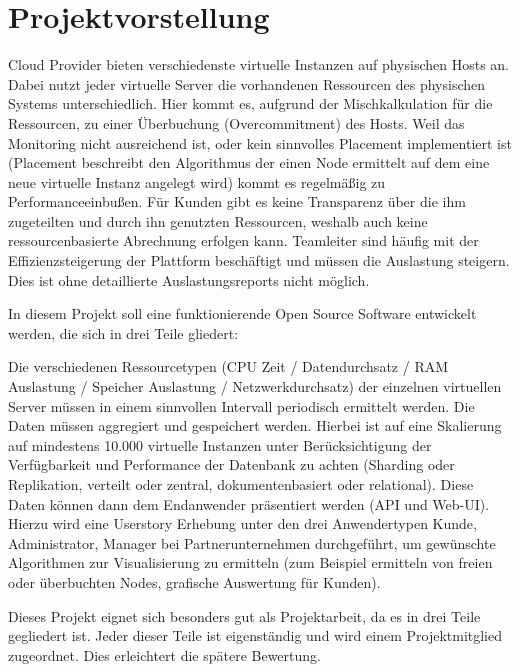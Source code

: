 \section{Projektvorstellung}
\label{subsubsec:projektvorstellung}
Cloud Provider bieten verschiedenste virtuelle Instanzen auf physischen Hosts
an. Dabei nutzt jeder virtuelle Server die vorhandenen Ressourcen des
physischen Systems unterschiedlich. Hier kommt es, aufgrund der
Mischkalkulation für die Ressourcen, zu einer Überbuchung (Overcommitment) des
Hosts. Weil das Monitoring nicht ausreichend ist, oder kein sinnvolles
Placement implementiert ist (Placement beschreibt den Algorithmus der einen
Node ermittelt auf dem eine neue virtuelle Instanz angelegt wird) kommt es
regelmäßig zu Performanceeinbußen. Für Kunden gibt es keine Transparenz über
die ihm zugeteilten und durch ihn genutzten Ressourcen, weshalb auch keine
ressourcenbasierte Abrechnung erfolgen kann. Teamleiter sind häufig mit der
Effizienzsteigerung der Plattform beschäftigt und müssen die Auslastung
steigern. Dies ist ohne detaillierte Auslastungsreports nicht möglich.

In diesem Projekt soll eine funktionierende Open Source Software entwickelt
werden, die sich in drei Teile gliedert:

\begin{outline}
  \1 Die verschiedenen Ressourcetypen (CPU Zeit / Datendurchsatz / RAM
  Auslastung / Speicher Auslastung / Netzwerkdurchsatz) der einzelnen
  virtuellen Server müssen in einem sinnvollen Intervall periodisch ermittelt
  werden.
  \1 Die Daten müssen aggregiert und gespeichert werden. Hierbei ist auf eine
  Skalierung auf mindestens 10.000 virtuelle Instanzen unter Berücksichtigung
  der Verfügbarkeit und Performance der Datenbank zu achten (Sharding oder
  Replikation, verteilt oder zentral, dokumentenbasiert oder relational).
  \1 Diese Daten können dann dem Endanwender präsentiert werden (\gls{API} und
  Web-UI). Hierzu wird eine Userstory Erhebung unter den drei Anwendertypen
  Kunde, Administrator, Manager bei Partnerunternehmen durchgeführt, um
  gewünschte Algorithmen zur Visualisierung zu ermitteln (zum Beispiel
  ermitteln von freien oder überbuchten Nodes, grafische Auswertung für Kunden).
\end{outline}

Dieses Projekt eignet sich besonders gut als Projektarbeit, da es in drei Teile
gegliedert ist. Jeder dieser Teile ist eigenständig und wird einem
Projektmitglied zugeordnet. Dies erleichtert die spätere Bewertung.
\all%

